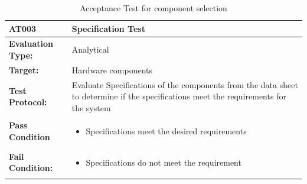 \begin{table}[H]
	\centering
	\caption{Acceptance Test for component selection}
	\begin{tabular}{|m{}|m{}|}
		\hline
		\textbf{AT003 }& \textbf{Specification Test} \\
		\hline
		\textbf{Evaluation Type:} & Analytical \\
		\hline
		\textbf{Target: } & Hardware components\\
		\hline
		\textbf{Test Protocol:} & Evaluate Specifications of the components from the data sheet to determine if the specifications meet the requirements for the system \\
		\hline
		\textbf{Pass Condition} & \vspace{5pt} \begin{itemize}
			\item Specifications meet the desired requirements
		\end{itemize} \\
		\hline
		\textbf{Fail Condition:} & \vspace{5pt} \begin{itemize}
			\item Specifications do not meet the requirement
		\end{itemize}\\
		\hline
	\end{tabular}
	
	\label{tab:AT003}
\end{table}

